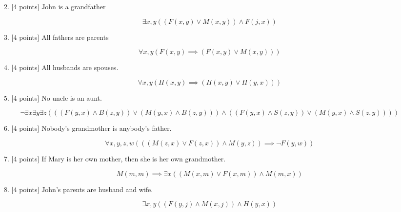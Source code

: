 \documentclass{article}
\begin{document}
\begin{enumerate}
\begin{enumerate}
\begin{answer}
\begin{displaymath}
	\end{displaymath}
\end{answer}
\item {[4 points]} John is a grandfather
\begin{answer}
	\begin{displaymath}
		\exists x,y ((F(x,y) \lor M(x, y)) \land F(j, x))
	\end{displaymath}
\end{answer}
\item {[4 points]} All fathers are parents
\begin{answer}
	\begin{displaymath}
		\forall x,y (F(x,y) \implies (F(x,y) \lor M(x, y)))
	\end{displaymath}
\end{answer}
\item {[4 points]} All husbands are spouses.
\begin{answer}
	\begin{displaymath}
		\forall x, y(H(x, y) \implies (H(x, y) \lor H(y, x)))
	\end{displaymath}
\end{answer}
\item {[4 points]} No uncle is an aunt.
\begin{answer}
	\begin{displaymath}
		\neg \exists x \exists y \exists z (((F(y,x) \land B(z,y)) \lor (M(y,x) \land
		B(z,y)))  \land ((F(y,x) \land S(z,y)) \lor (M(y,x) \land S(z,y))))
	\end{displaymath}
\end{answer}
\item {[4 points]} Nobody's grandmother is anybody's father.
\begin{answer}
	\begin{displaymath}
		\forall x, y, z, w (((M(z, x) \lor F(z, x)) \land M(y, z)) \implies \neg F(y,
		w))
	\end{displaymath}
\end{answer}
\item {[4 points]} If Mary is her own mother, then she is her own grandmother.
\begin{answer}
	\begin{displaymath}
		M(m, m) \implies \exists x ((M(x, m) \lor F(x, m)) \land M(m, x))
	\end{displaymath}
\end{answer}
\item {[4 points]} John's parents are husband and wife.
\begin{answer}
	\begin{displaymath}
		\exists x, y ((F(y, j) \land M(x, j)) \land H(y, x))
	\end{displaymath}
\end{answer}
\end{enumerate}


\end{enumerate}
\end{document}
